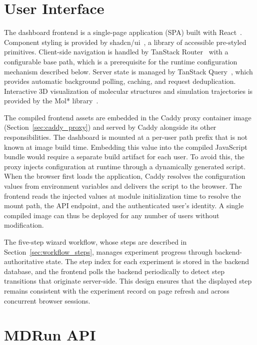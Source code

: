 \documentclass[
  digital,     %
  color,       %
  oneside,     %
  nosansbold,  %
  nocolorbold, %
  lof,         %
  lot,         %
]{fithesis4}
\begin{document}
\section{User Interface}
\label{sec:user_interface}

The dashboard frontend is a single-page application (SPA) built with React~\cite{reactjs}. Component styling is provided by shadcn/ui~\cite{shadcnui}, a library of accessible pre-styled primitives. Client-side navigation is handled by TanStack Router~\cite{tanstack_router} with a configurable base path, which is a prerequisite for the runtime configuration mechanism described below. Server state is managed by TanStack Query~\cite{tanstack_query}, which provides automatic background polling, caching, and request deduplication. Interactive 3D visualization of molecular structures and simulation trajectories is provided by the Mol* library~\cite{molstar_viewer}.

The compiled frontend assets are embedded in the Caddy proxy container image (Section~\ref{sec:caddy_proxy}) and served by Caddy alongside its other responsibilities. The dashboard is mounted at a per-user path prefix that is not known at image build time. Embedding this value into the compiled JavaScript bundle would require a separate build artifact for each user. To avoid this, the proxy injects configuration at runtime through a dynamically generated script. When the browser first loads the application, Caddy resolves the configuration values from environment variables and delivers the script to the browser. The frontend reads the injected values at module initialization time to resolve the mount path, the API endpoint, and the authenticated user's identity. A single compiled image can thus be deployed for any number of users without modification.

The five-step wizard workflow, whose steps are described in Section~\ref{sec:workflow_steps}, manages experiment progress through backend-authoritative state. The step index for each experiment is stored in the backend database, and the frontend polls the backend periodically to detect step transitions that originate server-side. This design ensures that the displayed step remains consistent with the experiment record on page refresh and across concurrent browser sessions.

\section{MDRun API}
\label{sec:mdrun_api}
\end{document}
